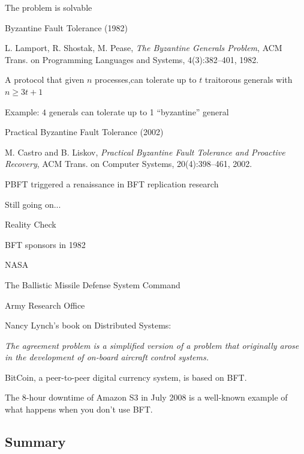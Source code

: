 \begin{frame}{The problem is solvable}

\begin{block}{Byzantine Fault Tolerance (1982)}
\BI
\item L. Lamport, R. Shostak, M. Pease, \emph{The Byzantine Generals Problem}, ACM Trans. on Programming Languages and Systems, 4(3):382--401, 1982. 
\item A protocol that given $n$ processes,can tolerate up to $t$ traitorous generals with $n \geq 3t+1$
\item Example: $4$ generals can tolerate up to 1 “byzantine” general
\EI
\end{block}

\begin{block}{Practical Byzantine Fault Tolerance (2002)}
\BI
\item M. Castro and B. Liskov, \emph{Practical Byzantine Fault Tolerance and Proactive Recovery}, ACM Trans. on Computer Systems, 20(4):398--461, 2002.
\item PBFT triggered a renaissance in BFT replication research
\item Still going on...
\EI
\end{block}
\end{frame}

\begin{frame}{Reality Check}
\BI
\item BFT sponsors in 1982
\BI
  \item NASA
  \item The Ballistic Missile Defense System Command
  \item Army Research Office
\EI
\bigskip
\item Nancy Lynch's book on Distributed Systems:\\
\BI
\item
\emph{The agreement problem is a simplified version of a problem that originally
arose in the development of on-board aircraft control systems.
}
\EI
\bigskip
\item BitCoin, a peer-to-peer digital currency system, is based on BFT.
\bigskip
\item The 8-hour downtime of Amazon S3 in July 2008 is a well-known example
  of what happens when you don't use BFT.
\EI
\end{frame}

\subsection{Summary}


